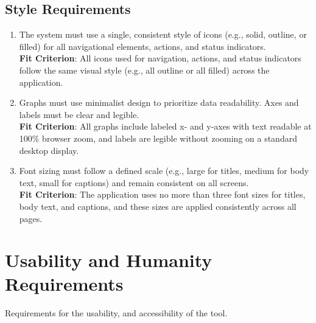 \documentclass[12pt]{article}
\begin{document}
\subsection{Style Requirements}
\begin{enumerate}[label=LF-SR\arabic*]
  \item The system must use a single, consistent style of icons (e.g., solid, outline, or filled) for all navigational elements, actions, and status indicators.
  \\ \textbf{Fit Criterion}: All icons used for navigation, actions, and status indicators follow the same visual style (e.g., all outline or all filled) across the application.
  \item Graphs must use minimalist design to prioritize data readability. Axes and labels must be clear and legible.
  \\ \textbf{Fit Criterion}: All graphs include labeled x- and y-axes with text readable at 100\% browser zoom, and labels are legible without zooming on a standard desktop display.
  \item Font sizing must follow a defined scale (e.g., large for titles, medium for body text, small for captions) and remain consistent on all screens.
  \\ \textbf{Fit Criterion}: The application uses no more than three font sizes for titles, body text, and captions, and these sizes are applied consistently across all pages.
\end{enumerate}

\section{Usability and Humanity Requirements}
Requirements for the usability, and accessibility of the tool.
\end{document}
